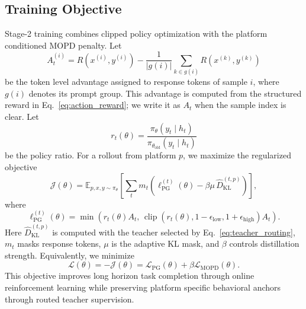 \subsection{Training Objective}
\label{sec:training_objective}

Stage-2 training combines clipped policy optimization with the platform
conditioned MOPD penalty. Let
\begin{equation}
A_t^{(i)}
=
R(x^{(i)},y^{(i)})
-
\frac{1}{|g(i)|}\sum_{k\in g(i)}R(x^{(k)},y^{(k)})
\label{eq:advantage}
\end{equation}
be the token level advantage assigned to response tokens of sample $i$,
where $g(i)$ denotes its prompt group. This advantage is computed from the
structured reward in Eq.~\ref{eq:action_reward}; we write it as $A_t$ when
the sample index is clear. Let
\[
r_t(\theta)
=
\frac{
\pi_\theta(y_t\mid h_t)
}{
\pi_{\theta_{\mathrm{old}}}(y_t\mid h_t)
}
\]
be the policy ratio. For a rollout from platform $p$, we maximize the
regularized objective
\begin{equation}
\mathcal{J}(\theta)
=
\mathbb{E}_{p,x,y\sim\pi_\theta}
\left[
\sum_t m_t
\left(
\ell_{\mathrm{PG}}^{(t)}(\theta)
-
\beta\mu\,\hat{D}_{\mathrm{KL}}^{(t,p)}
\right)
\right],
\label{eq:regularized_objective}
\end{equation}
where
\begin{equation}
\ell_{\mathrm{PG}}^{(t)}(\theta)
=
\min
\left(
r_t(\theta)A_t,\,
\operatorname{clip}
\left(
r_t(\theta),
1-\epsilon_{\mathrm{low}},
1+\epsilon_{\mathrm{high}}
\right)A_t
\right).
\label{eq:policy_objective}
\end{equation}
Here $\hat{D}_{\mathrm{KL}}^{(t,p)}$ is computed with the teacher selected
by Eq.~\ref{eq:teacher_routing}, $m_t$ masks response tokens, $\mu$ is the
adaptive KL mask, and $\beta$ controls distillation strength. Equivalently,
we minimize
\begin{equation}
\mathcal{L}(\theta)
=
-
\mathcal{J}(\theta)
=
\mathcal{L}_{\mathrm{PG}}(\theta)
+
\beta\mathcal{L}_{\mathrm{MOPD}}(\theta).
\label{eq:final_loss}
\end{equation}
This objective improves long horizon task completion through online
reinforcement learning while preserving platform specific behavioral
anchors through routed teacher supervision.
